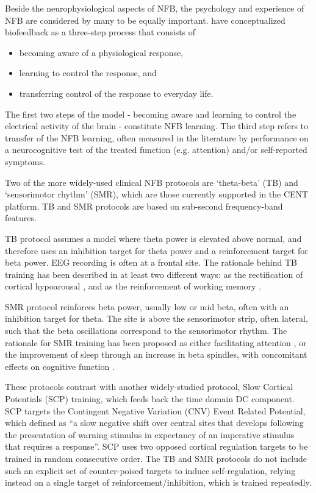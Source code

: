 \documentclass[fleqn,10pt]{wlpeerj}
\begin{document}
Beside the neurophysiological aspects of NFB, the psychology and experience of NFB are considered by many to be equally important. \cite{Calderon2004} have conceptualized biofeedback as a three-step process that consists of 

\begin{itemize}
	\item becoming aware of a physiological response, 
	\item learning to control the response, and 
	\item transferring control of the response to everyday life.
\end{itemize}

The first two steps of the model - becoming aware and learning to control the electrical activity of the brain - constitute NFB learning. The third step refers to transfer of the NFB learning, often measured in the literature by performance on a neurocognitive test of the treated function (e.g. attention) and/or self-reported symptoms.


Two of the more widely-used clinical NFB protocols are ‘theta-beta’ (TB) and ‘sensorimotor rhythm’ (SMR), which are those currently supported in the CENT platform. TB and SMR protocols are based on sub-second frequency-band features.

TB protocol assumes a model where theta power is elevated above normal, and therefore uses an inhibition target for theta power and a reinforcement target for beta power. EEG recording is often at a frontal site. The rationale behind TB training has been described in at least two different ways: as the rectification of cortical hypoarousal \citep{Barry2003}, and as the reinforcement of working memory \citep{Vernon2003}.

SMR protocol reinforces beta power, usually low or mid beta, often with an inhibition target for theta. The site is above the sensorimotor strip, often lateral, such that the beta oscillations correspond to the sensorimotor rhythm. The rationale for SMR training has been proposed as either facilitating attention \citep{Vernon2003}, or the improvement of sleep through an increase in beta spindles, with concomitant effects on cognitive function \citep{Arns2014}.

These protocols contrast with another widely-studied protocol, Slow Cortical Potentials (SCP) training, which feeds back the time domain DC component. SCP targets the Contingent Negative Variation (CNV) Event Related Potential, which \cite{Mayer2015} defined as “a slow negative shift over central sites that develops following the presentation of warning stimulus in expectancy of an imperative stimulus that requires a response”. SCP uses two opposed cortical regulation targets to be trained in random consecutive order. The TB and SMR protocols do not include such an explicit set of counter-poised targets to induce self-regulation, relying instead on a single target of reinforcement/inhibition, which is trained repeatedly. \\
\\
\end{document}
